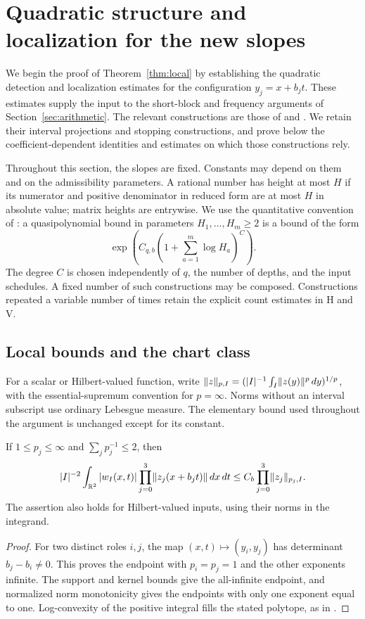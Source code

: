 \section{Quadratic structure and localization for the new slopes}
\label{sec:analytic}

We begin the proof of Theorem~\ref{thm:local} by establishing the
quadratic detection and localization estimates for the configuration
\(y_j=x+b_jt\).  These estimates supply the input to the short-block
and frequency arguments of Section~\ref{sec:arithmetic}.  The relevant
constructions are those of \cite[Sections~3--6]{H} and
\cite[Sections~4--6]{V}.  We retain their interval projections and
stopping constructions, and prove below the coefficient-dependent
identities and estimates on which those constructions rely.

Throughout this section, the slopes are fixed.  Constants may depend on
them and on the admissibility parameters.  A rational number has height
at most \(H\) if its numerator and positive denominator in reduced form
are at most \(H\) in absolute value; matrix heights are entrywise.
We use the quantitative convention of \cite[Section~3.1]{H}: a
quasipolynomial bound in parameters \(H_1,\ldots,H_m\ge2\) is a bound
of the form
\[
 \exp\!\left(C_{q,b}\left(1+\sum_{a=1}^m\log H_a\right)^C\right).
\]
The degree \(C\) is chosen independently of \(q\), the number of
depths, and the input schedules.  A fixed number of such constructions
may be composed.  Constructions repeated a variable number of times
retain the explicit count estimates in H and V.

\subsection{Local bounds and the chart class}

For a scalar or Hilbert-valued function, write
\(\lVert z\rVert_{p,I}=(|I|^{-1}\int_I\lVert z(y)\rVert^p\,dy)^{1/p}\),
with the essential-supremum convention for \(p=\infty\).
Norms without an interval subscript use ordinary Lebesgue measure.
The elementary bound used throughout the argument is unchanged except
for its constant.
\begin{lemma}\label{lem:local-absolute}
If \(1\le p_j\le\infty\) and \(\sum_jp_j^{-1}\le2\), then
\[
 |I|^{-2}\int_{\mathbb R^2}|w_I(x,t)|
                 \prod_{j=0}^3\lVert z_j(x+b_jt)\rVert\,dx\,dt
 \le C_b\prod_{j=0}^3\lVert z_j\rVert_{p_j,I}.
\]
The assertion also holds for Hilbert-valued inputs, using their norms
in the integrand.
\end{lemma}
\begin{proof}
For two distinct roles \(i,j\), the map
\((x,t)\mapsto(y_i,y_j)\) has determinant \(b_j-b_i\ne0\).
This proves the endpoint with \(p_i=p_j=1\) and the other exponents
infinite.  The support and kernel bounds give the all-infinite
endpoint, and normalized norm monotonicity gives the endpoints with
only one exponent equal to one.  Log-convexity of the positive integral
fills the stated polytope, as in \cite[Lemma~2.1]{H}.
\end{proof}

